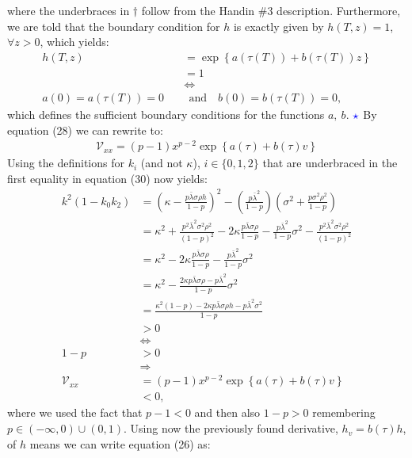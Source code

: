 \documentclass[11pt]{article}
\numberwithin{equation}{section}
\newcommand{\lc}{\left\{}
\newcommand{\rc}{\right\}}
\begin{document}
where the underbraces in $\dagger$ follow from the Handin \#3 description. Furthermore, we are told that the boundary condition for $h$ is exactly given by
$h(T,z)=1$, $\forall z>0$, which yields:
\begin{align*}
    h(T,z)&=\exp{\lc a(\tau(T))+b(\tau(T))z\rc}\\
    &=1\\
    &\iff\\
    a(0)=a(\tau(T))=0 \quad     &\: \: \text{and} \quad b(0)=b(\tau(T))=0,
\end{align*}
which defines the sufficient boundary conditions for the functions $a,\:b$.
\newpage
$\textcolor{blue}{\star}$  By equation (28) we can rewrite to:
\begin{align*}
    \mathcal{V}_{xx}=(p-1)x^{p-2}\exp{\lc a(\tau)+b(\tau)v \rc}
\end{align*}
Using the definitions for $k_i$ (and not $\kappa$), $i\in \{0,1,2\}$ that are underbraced in the
first equality in equation (30) now yields:
\begin{align*}
    k^2 (1 - k_0k_2) &= \left( \kappa - \frac{p\bar{\lambda}\sigma\rho h}{1 - p} \right)^2 - \left( \frac{p\bar{\lambda}^2}{1 - p} \right) \left( \sigma^2 + \frac{p\sigma^2\rho^2}{1 - p} \right) \\
    &= \kappa^2 + \frac{p^2\bar{\lambda}^2\sigma^2\rho^2}{(1 - p)^2} - 2\kappa \frac{p\bar{\lambda}\sigma\rho}{1 - p} - \frac{p\bar{\lambda}^2}{1 - p} \sigma^2 - \frac{p^2\bar{\lambda}^2\sigma^2\rho^2}{(1 - p)^2} \\
    &= \kappa^2 - 2\kappa \frac{p \bar{\lambda}\sigma\rho }{1 - p} - \frac{p\bar{\lambda}^2}{1 - p} \sigma^2 \\
    &= \kappa^2 -  \frac{2\kappa p \bar{\lambda}\sigma\rho-p\bar{\lambda}^2}{1 - p} \sigma^2 \\
    &=\frac{\kappa^2 (1 - p) - 2\kappa p \bar{\lambda}\sigma\rho h - p\bar{\lambda}^2\sigma^2 }{1 - p} \\
    &> 0 \\
    &\iff\\
    1 - p&> 0 \\
    &\Rightarrow\\
    \mathcal{V}_{xx}&=(p-1)x^{p-2}\exp{\lc a(\tau)+b(\tau)v \rc}\\
    & < 0,
\end{align*}
where we used the fact that $p-1<0$ and then also $1-p>0$ remembering $p\in
(-\infty,0) \cup (0,1)$. Using now the previously found derivative, $h_v=b(\tau)h$,
of $h$ means we can write equation (26) as:
\end{document}

